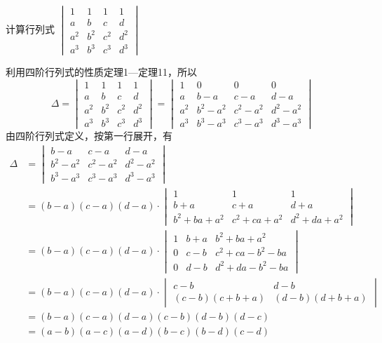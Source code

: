\begin{example}
计算行列式
$\begin{vmatrix}
    1&1&1&1\\a&b&c&d\\
    a^2&b^2&c^2&d^2\\a^3&b^3&c^3&d^3
\end{vmatrix}$
\end{example}

\begin{solution}    
利用四阶行列式的性质定理1—定理11，所以
\[\Delta=\begin{vmatrix}
    1&1&1&1\\a&b&c&d\\
    a^2&b^2&c^2&d^2\\a^3&b^3&c^3&d^3 
\end{vmatrix}=\begin{vmatrix}
    1&0&0&0\\
    a&b-a&c-a&d-a\\
    a^2&b^2-a^2&c^2-a^2&d^2-a^2\\
    a^3&b^3-a^3&c^3-a^3&d^3-a^3
\end{vmatrix}\]
由四阶行列式定义，按第一行展开，有
\[\begin{split}
\Delta&=\begin{vmatrix}
    b-a&c-a&d-a\\
    b^2-a^2&c^2-a^2&d^2-a^2\\
    b^3-a^3&c^3-a^3&d^3-a^3
\end{vmatrix}\\
&=(b-a)(c-a)(d-a)\cdot \begin{vmatrix}
   1&1&1\\
   b+a&c+a&d+a\\b^2+ba+a^2&c^2+ca+a^2&d^2+da+a^2 
\end{vmatrix}   \\
&= (b-a)(c-a)(d-a)\cdot \begin{vmatrix}
    1&b+a&b^2+ba+a^2\\
    0&c-b&c^2+ca-b^2-ba\\
    0&d-b&d^2+da -b^2-ba
 \end{vmatrix}   \\
 &= (b-a)(c-a)(d-a)\cdot \begin{vmatrix}
    c-b&d-b\\
    (c-b)(c+b+a)&  (d-b)(d+b+a)
 \end{vmatrix}   \\
 &=(b-a)(c-a)(d-a)(c-b)(d-b)(d-c)\\
&=(a-b)(a-c)(a-d)(b-c)(b-d)(c-d)
\end{split}\]
\end{solution}

